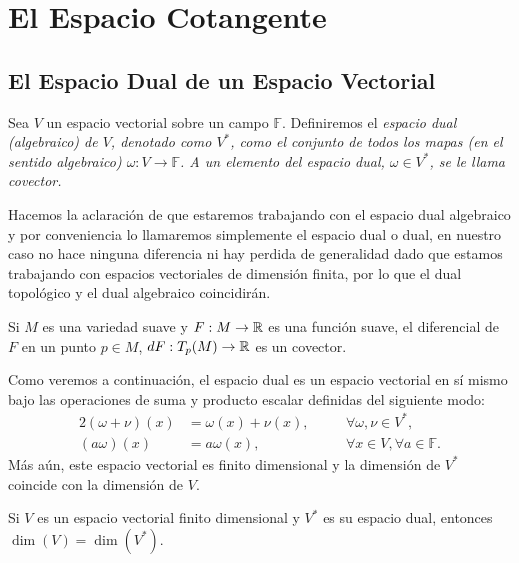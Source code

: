 \section{El Espacio Cotangente}\label{Sección: Espacio Cotangente}
\subsection{El Espacio Dual de un Espacio Vectorial}

\begin{definition}
	Sea $V$ un espacio vectorial sobre un campo $\mathbb{F}$. Definiremos el \it{espacio dual (algebraico) de $V$}, denotado como $V^*$, como el conjunto de todos los mapas (en el sentido algebraico) $\omega: V \to \mathbb{F}$. A un elemento del espacio dual, $\omega \in V^*$, se le llama \it{covector}.
\end{definition}

Hacemos la aclaración de que estaremos trabajando con el espacio dual algebraico y por conveniencia lo llamaremos simplemente el espacio dual o dual, en nuestro caso no hace ninguna diferencia ni hay perdida de generalidad dado que estamos trabajando con espacios vectoriales de dimensión finita, por lo que el dual topológico y el dual algebraico coincidirán.

\begin{example}
	Si $M$ es una variedad suave y $F: M \to \mathbb{R}$ es una función suave, el diferencial de $F$ en un punto $p \in M$, $dF: T_p(M) \to \mathbb{R}$ es un covector.
\end{example}

Como veremos a continuación, el espacio dual es un espacio vectorial en sí mismo bajo las operaciones de suma y producto escalar definidas del siguiente modo:
\begin{alignat*}{2}
	(\omega+\nu)(x) & =\omega(x)+\nu(x), \quad &  & \forall \omega,\nu \in V^{*},           \\
	(a\omega)(x)    & = a\omega(x), \quad      &  & \forall x\in V,\forall a \in\mathbb{F}.
\end{alignat*}
Más aún, este espacio vectorial es finito dimensional y la dimensión de $V^{*}$ coincide con la dimensión de $V$.

\begin{theorem}\label{Teorema: Dimensión del Espacio Dual}
	Si $V$ es un espacio vectorial finito dimensional y $V^{*}$ es su espacio dual, entonces $\dim(V) = \dim(V^{*})$.
\end{theorem}

